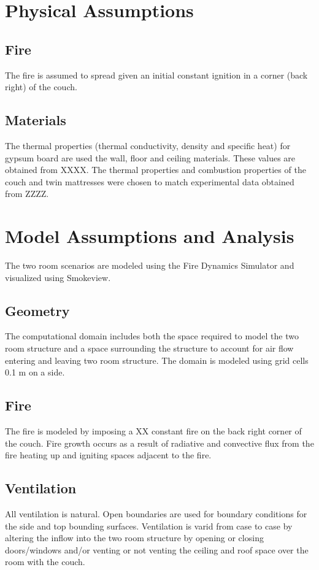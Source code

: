 \documentclass[11pt]{book}
\begin{document}
\section{Physical Assumptions}
\subsection{Fire}
The fire is assumed to spread given an initial constant ignition in a corner
(back right) of the couch.

\subsection{Materials}
The thermal properties (thermal conductivity, density and specific heat) for gypsum board are used the wall, floor and ceiling materials.  These values are obtained from XXXX.  The thermal properties and combustion properties of the couch and twin mattresses were chosen to match experimental data obtained from ZZZZ.


\section{Model Assumptions and Analysis}
The two room scenarios are modeled using the Fire Dynamics Simulator and
visualized using Smokeview.

\subsection{Geometry}
The computational domain includes both the space required to model the two room
structure and a space surrounding the structure to account for air flow entering and leaving two room structure.  The domain is modeled using grid cells 0.1 m on a side.


\subsection{Fire}
The fire is modeled by imposing a XX constant fire on the back right corner of the
couch.  Fire growth occurs as a result of radiative and convective flux from the fire heating up and igniting spaces adjacent to the fire.

\subsection{Ventilation}
All ventilation is natural.  Open boundaries are used for boundary conditions for the side and top bounding surfaces.  Ventilation is varid from case to case by altering the inflow into the two room structure by opening or closing doors/windows and/or
venting or not venting the ceiling and roof space over the room with the couch.
\end{document}
